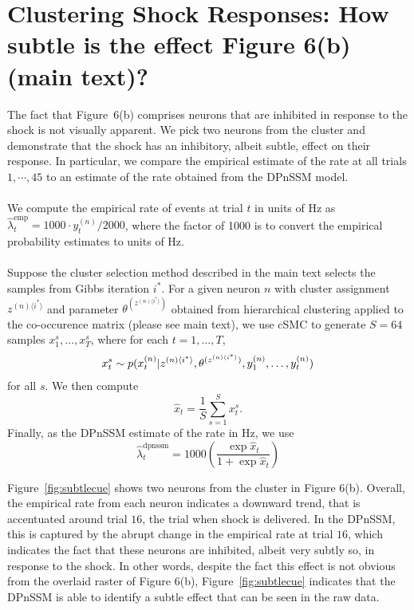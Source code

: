 \documentclass{article}
\begin{document}
\section{Clustering Shock Responses: How subtle is the effect Figure 6(b) (main text)?}

The fact that Figure~6(b) comprises neurons that are inhibited in response to the shock is not visually apparent. We pick two neurons from the cluster and demonstrate that the shock has an inhibitory, albeit subtle, effect on their response. In particular, we compare the empirical estimate of the rate at all trials $1,\cdots,45$ to an estimate of the rate obtained from the DPnSSM model.
\\
\\
\noindent We compute the empirical rate of events at trial $t$ in units of Hz as $\hat{\lambda}^{\text{emp}}_t = 1000 \cdot y_t^{(n)}/2000$, where the factor of 1000 is to convert the empirical probability estimates to units of Hz.
\\
\\
Suppose the cluster selection method described in the main text selects the samples from Gibbs iteration $i^*$. For a given neuron $n$ with cluster assignment $z^{(n)\langle i^{*}\rangle}$ and parameter $\theta^{(z^{(n)\langle i^{*}\rangle})}$ obtained from hierarchical clustering applied to the co-occurence matrix (please see main text), we use cSMC to generate $S = 64$ samples $x_1^s,\ldots,x_T^s$, where for each $t = 1, \ldots, T$,
\begin{align}
x_t^s \sim p(x_t^{(n)}|z^{(n)\langle i^{*}\rangle},\theta^{(z^{(n)\langle i^{*}\rangle})}, \idx[1] y n, \ldots, \idx[t] y n)
\end{align}
for all $s$.  
We then compute
\begin{equation}
\hat{x}_t = \frac{1}{S} \sum_{s=1}^S x_t^s.
\end{equation}
\noindent Finally, as the DPnSSM estimate of the rate in Hz, we use
\begin{equation}
\hat{\lambda}^{\text{dpnssm}}_t = 1000 \left(\frac{\exp {\hat{x}_t}}{1+  \exp {\hat{x}_t}}\right)
\end{equation}

\noindent Figure~\ref{fig:subtlecue} shows two neurons from the cluster in Figure 6(b). Overall, the empirical rate from each neuron indicates a downward trend, that is accentuated around trial $16$, the trial when shock is delivered. In the DPnSSM, this is captured by the abrupt change in the empirical rate at trial $16$, which indicates the fact that these neurons are inhibited, albeit very subtly so, in response to the shock. In other words, despite the fact this effect is not obvious from the overlaid raster of Figure 6(b), Figure~\ref{fig:subtlecue} indicates that the DPnSSM is able to identify a subtle effect that can be seen in the raw data.
\end{document}
